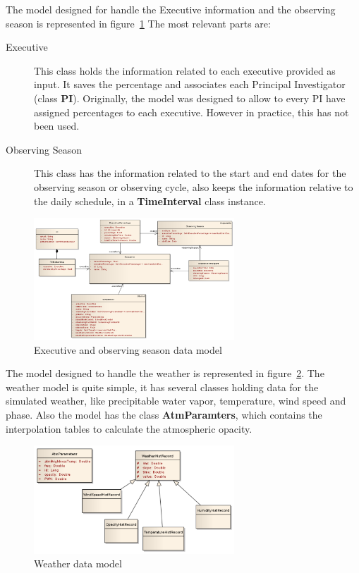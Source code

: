 The model designed for handle the Executive information and the observing season is represented in figure~\ref{fig:datamodel-executive}
The most relevant parts are: 
\begin{description}
\item[Executive] This class holds the information related to each executive provided as input. It saves the percentage and associates each Principal Investigator (class \textbf{PI}). Originally, the model was designed to allow to every PI have assigned percentages to each executive. However in practice, this has not been used.

\item[Observing Season] This class has the information related to the start and end dates for the observing season or observing cycle, also keeps the information relative to the daily schedule, in a \textbf{TimeInterval} class instance.
\end{description}

\begin{figure}[htbp]	
\begin{center}
\includegraphics[width=0.67\textwidth]{images/Executive}
\end{center}
\caption{Executive and observing season data model}
\label{fig:datamodel-executive}
\end{figure}

The model designed to handle the weather is represented in figure~\ref{fig:datamodel-weather}. The weather model is quite simple, it has several classes holding data for the simulated weather, like precipitable water vapor, temperature, wind speed and phase. Also the model has the class \textbf{AtmParamters}, which contains the interpolation tables to calculate the atmospheric opacity.

\begin{figure}[htbp]	
\begin{center}
\includegraphics[width=0.67\textwidth]{images/Weather}
\end{center}
\caption{Weather data model}
\label{fig:datamodel-weather}
\end{figure}

